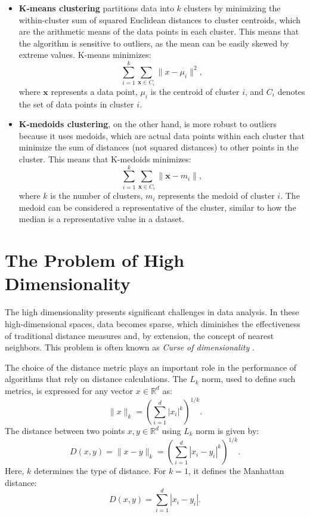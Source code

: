 \documentclass[12pt]{book}
\begin{document}
\begin{itemize}
    \item \textbf{K-means clustering} partitions data into $k $ clusters by minimizing the within-cluster sum of squared Euclidean distances to cluster centroids, which are the arithmetic means of the data points in each cluster. This means that the algorithm is sensitive to outliers, as the mean can be easily skewed by extreme values. K-means minimizes:
    \[
    \sum_{i=1}^{k} \sum_{\mathbf{x} \in C_i} \|x - \mu_i\|^2,
    \]
    where $\mathbf{x}$ represents a data point, $\mu_i$ is the centroid of cluster $i $, and $C_i$ denotes the set of data points in cluster $i$.

    \item \textbf{K-medoids clustering}, on the other hand, is more robust to outliers because it uses medoids, which are actual data points within each cluster that minimize the sum of distances (not squared distances) to other points in the cluster. This means that K-medoids minimizes:
    \[
    \sum_{i=1}^{k} \sum_{\mathbf{x} \in C_i} \|\mathbf{x} - m_i\|,
    \]
    where $k$ is the number of clusters, $m_i$ represents the medoid of cluster $i$. The medoid can be considered a representative of the cluster, similar to how the median is a representative value in a dataset.
\end{itemize}







\section{The Problem of High Dimensionality} \label{sec:high_dim}


The high dimensionality presents significant challenges in data analysis. In these high-dimensional spaces, data becomes sparse, which diminishes the effectiveness of traditional distance measures and, by extension, the concept of nearest neighbors. This problem is often known as \textit{Curse of dimensionality} \citep{aggarwal2001surprising}.

The choice of the distance metric plays an important role in the performance of algorithms that rely on distance calculations. The $L_k$ norm, used to define such metrics, is expressed for any vector $x \in \mathbb{R}^d$ as:
\[
\|x\|_k = \left(\sum_{i=1}^{d} |x_i|^k\right)^{1/k}.
\]
The distance between two points $x, y \in \mathbb{R}^d$ using $L_k$ norm is given by:
\[
D(x,y) = \|x - y\|_k = \left(\sum_{i=1}^{d} |x_i - y_i|^k\right)^{1/k}.
\]
Here, $ k $ determines the type of distance. For $k=1$, it defines the Manhattan distance:
\[
D(x,y) = \sum_{i=1}^{d} |x_i - y_i|.
\] 
\end{document}
